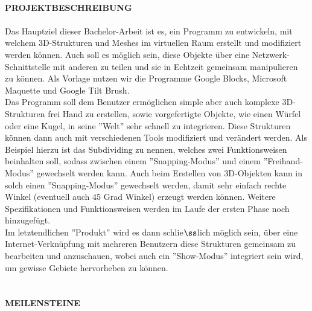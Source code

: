 \documentclass{article}
\begin{document}
\hfill \\
\textbf{PROJEKTBESCHREIBUNG} \\
\\
Das Hauptziel dieser Bachelor-Arbeit ist es, ein Programm zu entwickeln, mit welchem 3D-Strukturen und Meshes im virtuellen Raum erstellt und modifiziert werden k\"onnen. Auch soll es m\"oglich sein, diese Objekte über eine Netzwerk-Schnittstelle mit anderen zu teilen und sie in Echtzeit gemeinsam manipulieren zu k\"onnen.  Als Vorlage nutzen wir die Programme Google Blocks, Microsoft Maquette und Google Tilt Brush. \\
Das Programm soll dem Benutzer erm\"oglichen simple aber auch komplexe 3D-Strukturen frei Hand zu erstellen, sowie vorgefertigte Objekte, wie einen W\"urfel oder eine Kugel, in seine ''Welt'' sehr schnell zu integrieren. Diese Strukturen können dann auch mit verschiedenen Tools modifiziert und verändert werden. Als Beispiel hierzu ist das Subdividing zu nennen, welches zwei Funktionsweisen beinhalten soll, sodass zwischen einem ''Snapping-Modus'' und einem ''Freihand-Modus'' gewechselt werden kann. Auch beim Erstellen von 3D-Objekten kann in solch einen ''Snapping-Modus'' gewechselt werden, damit sehr einfach rechte Winkel (eventuell auch 45 Grad Winkel) erzeugt werden k\"onnen. Weitere Spezifikationen und Funktionsweisen werden im Laufe der ersten Phase noch hinzugef\"ugt. \\
Im letztendlichen ''Produkt'' wird es dann schlie$\ss$lich m\"oglich sein, über eine Internet-Verkn\"upfung mit mehreren Benutzern diese Strukturen gemeinsam zu bearbeiten und anzuschauen, wobei auch ein ''Show-Modus'' integriert sein wird, um gewisse Gebiete hervorheben zu k\"onnen. \\
\hfill \\ \\
\textbf{MEILENSTEINE} 
\end{document}
